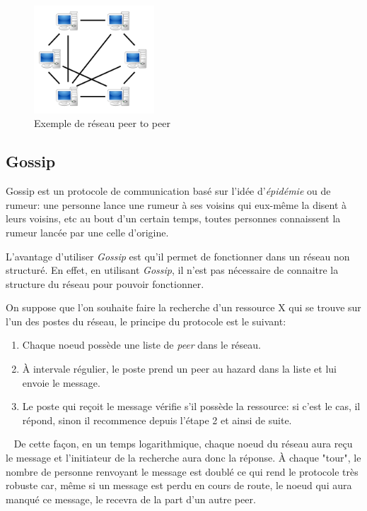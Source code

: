 	\begin{figure}
	  \center
      \includegraphics[width=0.4\textwidth]{includes/P2P-network.png}
      \caption{Exemple de réseau peer to peer}
      \label{fig:p2p}
    \end{figure}
	
	\subsection{Gossip}
	
		Gossip est un protocole de communication basé sur l'idée
		d'\emph{épidémie} ou de rumeur: une personne lance une rumeur à ses
		voisins qui eux-même la disent à leurs voisins, etc au bout d'un certain
		temps, toutes personnes connaissent la rumeur lancée par une celle
		d'origine.
		
		L'avantage d'utiliser \emph{Gossip} est qu'il permet de fonctionner dans
		un réseau non structuré. En effet, en utilisant \emph{Gossip}, il n'est
		pas nécessaire de connaitre la structure du réseau pour pouvoir
		fonctionner.
		
		On suppose que l'on souhaite faire la recherche d'un ressource X qui se
		trouve sur l'un des postes du réseau, le principe du protocole est le
		suivant:
		\begin{enumerate}
			\item Chaque noeud possède une liste de \emph{peer} dans le réseau.
			\item À intervale régulier, le poste prend un peer au hazard dans la
			liste et lui envoie le message.
			\item Le poste qui reçoit le message vérifie s'il possède la
			ressource: si c'est le cas, il répond, sinon il recommence depuis
			l'étape 2 et ainsi de suite.
		\end{enumerate}~
		De cette façon, en un temps logarithmique, chaque noeud du réseau aura
		reçu le message et l'initiateur de la recherche aura donc la réponse. À
		chaque "tour", le nombre de personne renvoyant le message est doublé ce
		qui rend le protocole très robuste car, même si un message est perdu en
		cours de route, le noeud qui aura manqué ce message, le recevra de la
		part d'un autre peer.\\
		
